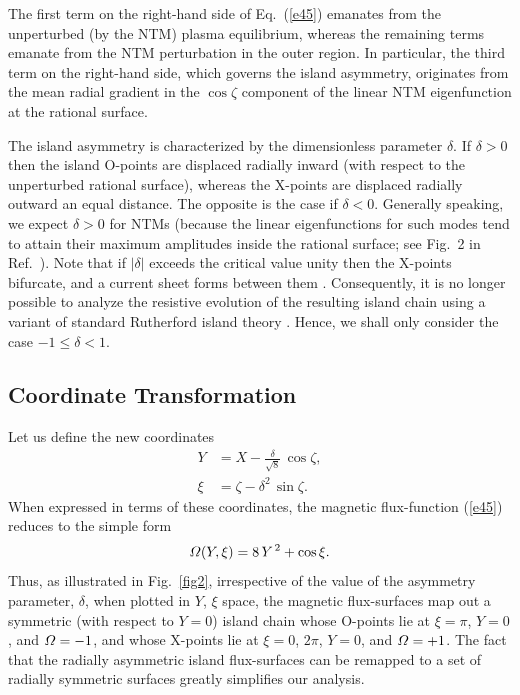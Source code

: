 \documentclass{iopjournal}
\begin{document}
The first term on the right-hand side of Eq.~(\ref{e45}) emanates from the unperturbed (by the NTM) plasma equilibrium, whereas the
remaining terms emanate from the NTM perturbation in the outer region. In particular, the third term on the right-hand
side, which governs the island asymmetry,  originates from  the mean radial gradient in the $\cos\zeta$ component of the linear NTM eigenfunction at the rational surface. 

The island asymmetry is characterized by the dimensionless parameter $\delta$. If $\delta >0$ then the island O-points are displaced radially inward (with respect to the unperturbed rational
surface), whereas the X-points are displaced radially outward an equal distance. The opposite is the case if $\delta <0$. Generally speaking,  we
expect $\delta>0$ for NTMs (because the linear eigenfunctions for such modes tend to attain their
maximum amplitudes inside the rational surface; 
see Fig.~2 in Ref.~\cite{white}). 
Note that if  $|\delta|$ exceeds the critical value
unity then the X-points bifurcate, and a current sheet forms between them \cite{wal}.  Consequently,  it is no longer possible to analyze the resistive evolution of the  resulting island chain  using a variant of standard Rutherford island theory \cite{ntm1}. Hence, we shall only consider the case $-1\leq \delta < 1$. 

\subsection{Coordinate Transformation}
Let us define the new coordinates \cite{island}
\begin{align}
Y &= X-\frac{\delta}{\sqrt{8}}\,\cos\zeta,\label{ek}\\[0.5ex]
\xi&=\zeta-\delta^2\,\sin\zeta.\label{ekepler}
\end{align}
When expressed in terms of these coordinates, the magnetic flux-function (\ref{e45}) reduces to the simple
form
\begin{equation}\label{eeven}
{\mit\Omega}(Y,\xi) =8\,Y^{\,2}+\cos\xi.
\end{equation}
Thus, as illustrated in Fig.~\ref{fig2}, irrespective of the value of the asymmetry parameter, $\delta$, when
plotted in $Y$, $\xi$ space, the magnetic flux-surfaces map out a symmetric (with respect to $Y=0$) island
chain whose O-points lie at $\xi=\pi$, $Y=0$,
and ${\mit\Omega}=-1$, and whose X-points lie at $\xi=0$, $2\pi$, $Y=0$, and ${\mit\Omega}=+1$.  The fact that the radially asymmetric island flux-surfaces can
be remapped to a set of radially symmetric surfaces greatly simplifies our analysis. 
\end{document}
